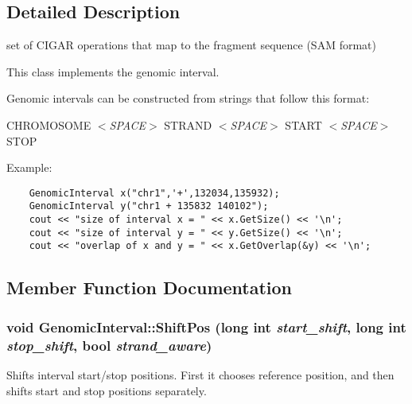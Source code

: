 \subsection{Detailed Description}
set of CIGAR operations that map to the fragment sequence (SAM format) 

This class implements the genomic interval.

Genomic intervals can be constructed from strings that follow this format:

CHROMOSOME {\em $<$SPACE$>$\/} STRAND {\em $<$SPACE$>$\/} START {\em $<$SPACE$>$\/} STOP

Example: 

\begin{Code}\begin{verbatim}    GenomicInterval x("chr1",'+',132034,135932);
    GenomicInterval y("chr1 + 135832 140102");
    cout << "size of interval x = " << x.GetSize() << '\n';
    cout << "size of interval y = " << y.GetSize() << '\n';
    cout << "overlap of x and y = " << x.GetOverlap(&y) << '\n';    
\end{verbatim}
\end{Code}

 

\subsection{Member Function Documentation}
\hypertarget{classGenomicInterval_ac9a744d5ecd181d6ddc9b7e47605a59}{
\subsubsection[ShiftPos]{\setlength{\rightskip}{0pt plus 5cm}void GenomicInterval::ShiftPos (long int {\em start\_\-shift}, \/  long int {\em stop\_\-shift}, \/  bool {\em strand\_\-aware})}}
\label{classGenomicInterval_ac9a744d5ecd181d6ddc9b7e47605a59}


Shifts interval start/stop positions. First it chooses reference position, and then shifts start and stop positions separately. 

